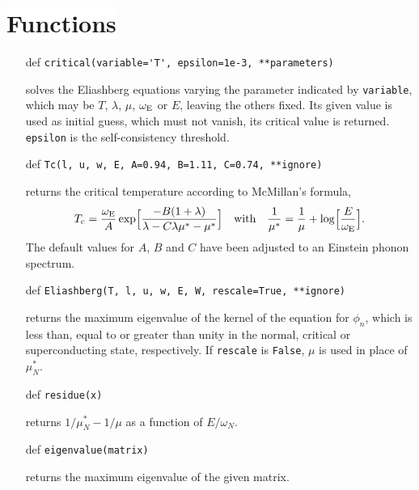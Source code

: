 \documentclass[a4paper]{article}
\def\sub#1{\sb{\mathrm{#1}}}
\def\headline#1{\section*{\normalsize\normalfont%
   \rlap{\rule[0.5ex]{\textwidth}{0.4pt}}\qquad\colorbox{white}{#1}}}
\begin{document}
   \headline{Functions}

   \begin{itemize}
      \item[def] \verb|critical(variable='T', epsilon=1e-3, **parameters)|

      solves the Eliashberg equations varying the parameter indicated by
      \verb|variable|, which may be $T$, $\lambda$, $\mu$, $\omega \sub E$ or
      $E$, leaving the others fixed. Its given value is used as initial guess,
      which must not vanish, its critical value is returned. \verb|epsilon| is
      the self-consistency threshold.

      \item[def] \verb|Tc(l, u, w, E, A=0.94, B=1.11, C=0.74, **ignore)|

      returns the critical temperature according to McMillan's formula,
      \begin{equation*}
         T \sub c = \frac {\omega \sub E} A \exp
         \Bigl[ \frac{-B (1 + \lambda)}{\lambda - C \lambda \mu^* - \mu^*} \Bigr]
         \quad \text{with} \quad
         \frac 1 {\mu^*} =
         \frac 1 \mu + \log \Bigl[ \frac E {\omega \sub E} \Bigr].
      \end{equation*}
      The default values for $A$, $B$ and $C$ have been adjusted to an Einstein
      phonon spectrum.

      \item[def] \verb|Eliashberg(T, l, u, w, E, W, rescale=True, **ignore)|

      returns the maximum eigenvalue of the kernel of the equation for $\phi_n$,
      which is less than, equal to or greater than unity in the normal, critical
      or superconducting state, respectively. If \verb|rescale| is \verb|False|,
      $\mu$ is used in place of $\mu^*_N$.

      \item[def] \verb|residue(x)|

      returns $1 / \mu^*_N - 1 / \mu$ as a function of $E / \omega_N$.

      \item[def] \verb|eigenvalue(matrix)|

      returns the maximum eigenvalue of the given matrix.
   \end{itemize}
\end{document}
